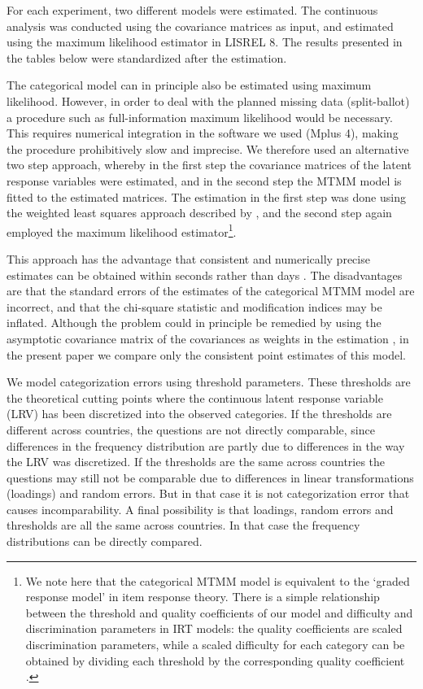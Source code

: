\documentclass[a4paper,12pt]{article}
\begin{document}
For each experiment, two different models were estimated. The continuous analysis was conducted using the covariance matrices as input, and estimated using the maximum likelihood estimator in LISREL 8. The results presented in the tables below were standardized after the estimation.

The categorical model can in principle also be estimated using maximum likelihood. However, in order to deal with the planned missing data (split-ballot) a procedure such as full-information maximum likelihood would be necessary. This requires numerical integration in the software we used (Mplus 4), making the procedure prohibitively slow and imprecise. We therefore used an alternative two step approach, whereby in the first step the covariance matrices of the latent response variables were estimated, and in the second step the MTMM model is fitted to the estimated matrices. The estimation in the first step was done using the weighted least squares approach described by \citet{flora_empirical_2004}, and the second step again employed the maximum likelihood estimator\footnote{We note here that the categorical MTMM model is equivalent to the `graded response model' in item response theory. There is a simple relationship between the threshold and quality coefficients of our model and difficulty and discrimination parameters in IRT models: the quality coefficients are scaled discrimination parameters, while a scaled difficulty for each category can be obtained by dividing each threshold by the corresponding quality coefficient \citep{muthen_latent_2002}.}.

This approach has the advantage that consistent and numerically precise estimates can be obtained within seconds rather than days \citep{muthen_latent_2002}. The disadvantages are that the standard errors of the estimates of the categorical MTMM model are incorrect, and that the chi-square statistic and modification indices may be inflated. Although the problem could in principle be remedied by using the asymptotic covariance matrix of the covariances as weights in the estimation \citep{joreskog_new_1990}, in the present paper we compare only the consistent point estimates of this model.


We model categorization errors using threshold parameters. These thresholds are the theoretical cutting points where the continuous latent response variable (LRV) has been discretized into the observed categories.  If the thresholds are different across countries, the questions are not directly comparable, since differences in the frequency distribution are partly due to differences in the way the LRV was discretized. If the thresholds are the same across countries the questions may still not be comparable due to differences in linear transformations (loadings) and random errors. But in that case it is not categorization error that causes incomparability. A final possibility is that loadings, random errors and thresholds are all the same across countries. In that case the frequency distributions can be directly compared. 
\end{document}
